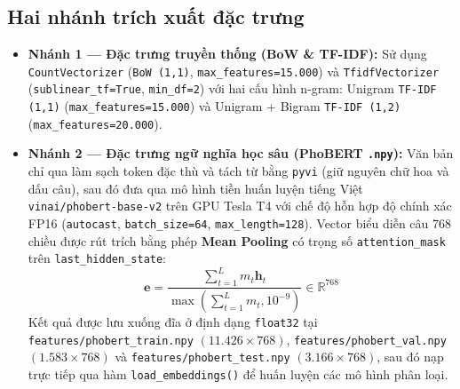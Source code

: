 \documentclass[12pt,a4paper]{article}
\begin{document}
\subsection{Hai nhánh trích xuất đặc trưng}
\begin{itemize}
    \item \textbf{Nhánh 1 — Đặc trưng truyền thống (BoW \& TF-IDF):} Sử dụng \texttt{CountVectorizer} (\texttt{BoW (1,1)}, \texttt{max\_features=15.000}) và \texttt{TfidfVectorizer} (\texttt{sublinear\_tf=True}, \texttt{min\_df=2}) với hai cấu hình n-gram: Unigram \texttt{TF-IDF (1,1)} (\texttt{max\_features=15.000}) và Unigram + Bigram \texttt{TF-IDF (1,2)} (\texttt{max\_features=20.000}).
    \item \textbf{Nhánh 2 — Đặc trưng ngữ nghĩa học sâu (PhoBERT \texttt{.npy}):} Văn bản chỉ qua làm sạch token đặc thù và tách từ bằng \texttt{pyvi} (giữ nguyên chữ hoa và dấu câu), sau đó đưa qua mô hình tiền huấn luyện tiếng Việt \texttt{vinai/phobert-base-v2} trên GPU Tesla T4 với chế độ hỗn hợp độ chính xác FP16 (\texttt{autocast}, \texttt{batch\_size=64}, \texttt{max\_length=128}). Vector biểu diễn câu 768 chiều được rút trích bằng phép \textbf{Mean Pooling} có trọng số \texttt{attention\_mask} trên \texttt{last\_hidden\_state}:
    \[
        \mathbf{e} = \frac{\sum_{t=1}^{L} m_t \mathbf{h}_t}{\max\left(\sum_{t=1}^{L} m_t, 10^{-9}\right)} \in \mathbb{R}^{768}
    \]
    Kết quả được lưu xuống đĩa ở định dạng \texttt{float32} tại \texttt{features/phobert\_train.npy} $(11.426 \times 768)$, \texttt{features/phobert\_val.npy} $(1.583 \times 768)$ và \texttt{features/phobert\_test.npy} $(3.166 \times 768)$, sau đó nạp trực tiếp qua hàm \texttt{load\_embeddings()} để huấn luyện các mô hình phân loại.
\end{itemize}
\end{document}
